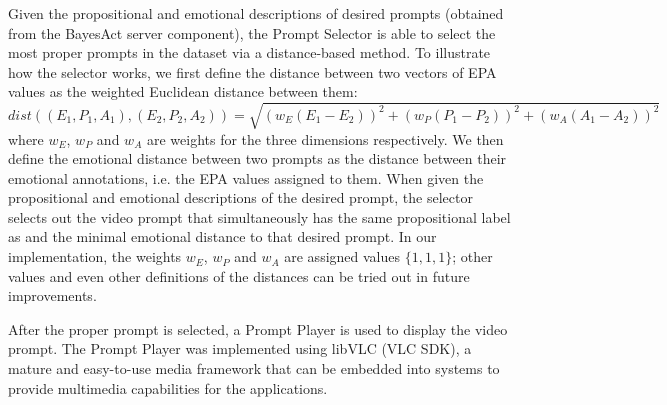 Given the propositional and emotional descriptions of desired prompts (obtained from the BayesAct server component), the Prompt Selector is able to select the most proper prompts in the dataset via a distance-based method. To illustrate how the selector works, we first define the distance between two vectors of EPA values as the weighted Euclidean distance between them:
$$dist((E_1, P_1, A_1), (E_2, P_2, A_2))=\sqrt{(w_E(E_1-E_2))^2+(w_P(P_1-P_2))^2+(w_A(A_1-A_2))^2}$$
where $w_E$, $w_P$ and $w_A$ are weights for the three dimensions respectively. We then define the emotional distance between two prompts as the distance between their emotional annotations, i.e. the EPA values assigned to them. When given the propositional and emotional descriptions of the desired prompt, the selector selects out the video prompt that simultaneously has the same propositional label as and the minimal emotional distance to that desired prompt. In our implementation, the weights $w_E$, $w_P$ and $w_A$ are assigned values $\{1, 1, 1\}$; other values and even other definitions of the distances can be tried out in future improvements.

After the proper prompt is selected, a Prompt Player is used to display the video prompt. The Prompt Player was implemented using libVLC (VLC SDK), a mature and easy-to-use media framework that can be embedded into systems to provide multimedia capabilities for the applications.



